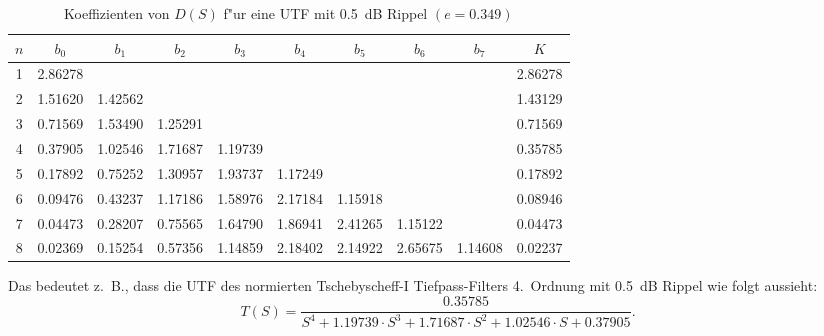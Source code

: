 \begin{table}[!htb]
\begin{center}
{\footnotesize
\begin{tabular}{|c||c|c|c|c|c|c|c|c||c|}\hline
$n$ & $b_0$ & $b_1$ & $b_2$ & $b_3$ & $b_4$ & $b_5$ & $b_6$ & $b_7$ & $K$\\ \hline\hline
 1 & 2.86278 & & & & & & & & 2.86278   \\ \hline
 2 & 1.51620 & 1.42562 & & & & & & & 1.43129\\ \hline
 3 & 0.71569 & 1.53490 & 1.25291 & & & & & & 0.71569  \\ \hline
 4 & 0.37905 & 1.02546 & 1.71687 & 1.19739 & & & & & 0.35785 \\ \hline
 5 & 0.17892 & 0.75252 & 1.30957 & 1.93737 & 1.17249 & & & & 0.17892  \\ \hline
 6 & 0.09476 & 0.43237 & 1.17186 & 1.58976 & 2.17184 & 1.15918 & & & 0.08946  \\ \hline   
 7 & 0.04473 & 0.28207 & 0.75565 & 1.64790 & 1.86941 & 2.41265 & 1.15122 & & 0.04473 \\ \hline   
 8 & 0.02369 & 0.15254 & 0.57356 & 1.14859 & 2.18402 & 2.14922 & 2.65675 & 1.14608 & 0.02237 \\ \hline
\end{tabular}\vspace*{-1mm}\caption{Koeffizienten von $D(S)$ f"ur eine UTF mit 0.5~dB Rippel $(e=0.349)$} \label{koef-0.5}
}
\end{center}
\vspace*{-4mm}
\end{table}
\nit Das bedeutet z.~B.,  dass die UTF des normierten Tschebyscheff-I Tiefpass-Filters 4.~Ordnung mit 0.5~dB Rippel wie folgt aussieht:\\
\begin{equation*}
T(S)=\frac{0.35785}{S^4+1.19739\cdot S^3+1.71687\cdot S^2+1.02546\cdot S+0.37905}.
\end{equation*}


